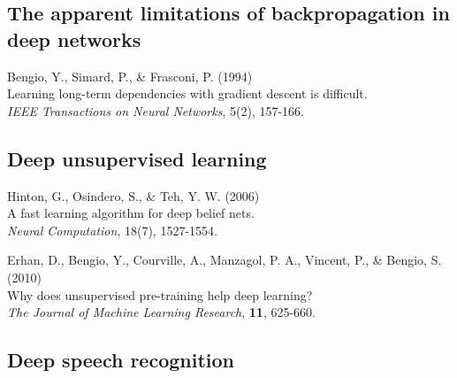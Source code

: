 \documentclass[]{article}
\begin{document}
\subsection{The apparent limitations of backpropagation in deep networks}

Bengio, Y., Simard, P., \& Frasconi, P. (1994)\\ Learning long-term
dependencies with gradient descent is difficult.\\ {\it IEEE Transactions
  on Neural Networks}, 5(2), 157-166.


\subsection{Deep unsupervised learning}
Hinton, G., Osindero, S., \& Teh, Y. W. (2006)\\ A fast learning algorithm
for deep belief nets.\\ {\it Neural Computation}, 18(7), 1527-1554.

Erhan, D., Bengio, Y., Courville, A., Manzagol, P. A., Vincent, P., \&
Bengio, S. (2010)\\ Why does unsupervised pre-training help deep
learning?\\ {\it The Journal of Machine Learning Research}, {\bf 11},
625-660.


\subsection{Deep speech recognition}

\end{document}
